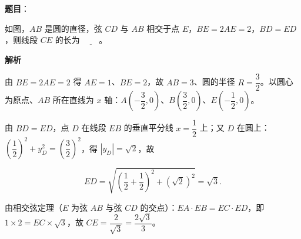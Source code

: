 \begin{answer}

\textbf{题目}：

如图，\(AB\) 是圆的直径，弦 \(CD\) 与 \(AB\) 相交于点 \(E\)，\(BE=2AE=2\)，\(BD=ED\)，则线段 \(CE\) 的长为 \(\underline{\qquad}\)。
\nopagebreak[4]
\begin{center}\end{center}
\nopagebreak[4]
\textbf{解析}

由 \(BE=2AE=2\) 得 \(AE=1\)、\(BE=2\)，故 \(AB=3\)、圆的半径 \(R=\dfrac{3}{2}\)。以圆心为原点、\(AB\) 所在直线为 \(x\) 轴：\(A\left(-\dfrac{3}{2},0\right)\)、\(B\left(\dfrac{3}{2},0\right)\)、\(E\left(-\dfrac{1}{2},0\right)\)。

由 \(BD=ED\)，点 \(D\) 在线段 \(EB\) 的垂直平分线 \(x=\dfrac{1}{2}\) 上；又 \(D\) 在圆上：\(\left(\dfrac{1}{2}\right)^{2}+y_{D}^{2}=\left(\dfrac{3}{2}\right)^{2}\)，得 \(|y_{D}|=\sqrt{2}\)，故

\nopagebreak[4]
\[
ED=\sqrt{\left(\dfrac{1}{2}+\dfrac{1}{2}\right)^{2}+(\sqrt{2})^{2}}=\sqrt{3}.
\]

由相交弦定理（\(E\) 为弦 \(AB\) 与弦 \(CD\) 的交点）：\(EA\cdot EB=EC\cdot ED\)，即 \(1\times 2=EC\times\sqrt{3}\)，故 \(CE=\dfrac{2}{\sqrt{3}}=\dfrac{2\sqrt{3}}{3}\)。


\end{answer}

